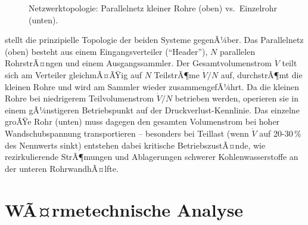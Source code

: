 ﻿\documentclass[12pt,a4paper,twoside]{article}
\theoremstyle{plain}
\theoremstyle{definition}
\theoremstyle{remark}
\newcommand{\dpL}{\Delta p / L}
\begin{document}
\begin{figure}
  \caption{Netzwerktopologie: Parallelnetz kleiner Rohre (oben) vs.\
           Einzelrohr (unten).}
  \label{fig:tikz_netzwerk}
\end{figure}

\noindent
{} stellt die prinzipielle Topologie der beiden
Systeme gegenÃ¼ber.
Das Parallelnetz (oben) besteht aus einem Eingangsverteiler (``Header''),
$N$ parallelen RohrstrÃ¤ngen und einem Ausgangssammler.
Der Gesamtvolumenstrom $\dot{V}$ teilt sich am Verteiler gleichmÃ¤ÃŸig auf
$N$ TeilstrÃ¶me $\dot{V}/N$ auf, durchstrÃ¶mt die kleinen Rohre und wird am
Sammler wieder zusammengefÃ¼hrt.
Da die kleinen Rohre bei niedrigerem Teilvolumenstrom $\dot{V}/N$ betrieben
werden, operieren sie in einem gÃ¼nstigeren Betriebspunkt auf der
Druckverlust-Kennlinie.
Das einzelne groÃŸe Rohr (unten) muss dagegen den gesamten Volumenstrom
bei hoher Wandschubspannung transportieren -- besonders bei Teillast
(wenn $\dot{V}$ auf 20-30\,\% des Nennwerts sinkt) entstehen dabei
kritische BetriebszustÃ¤nde, wie rezirkulierende StrÃ¶mungen und
Ablagerungen schwerer Kohlenwasserstoffe an der unteren RohrwandhÃ¤lfte.

\section{WÃ¤rmetechnische Analyse}
\label{sec:waerme}
\end{document}
